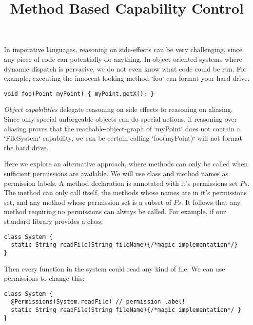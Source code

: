 \documentclass[a4paper,twoside,british,9pt]{extarticle}
\providecommand*{\code}[1]{\Q`#1`}
\begin{document}
\title{Method Based Capability Control}
\date{}
\maketitle
\vspace{-10ex}
In imperative languages, reasoning on side-effects can be very challenging,
since any piece of code can potentially do anything. In object oriented
systems where dynamic dispatch is pervasive, we do not even know what code
could be run. For example, executing the innocent looking method \code{foo}
can format your hard drive.

\begin{lstlisting}
void foo(Point myPoint) { myPoint.getX(); }
\end{lstlisting}

\emph{Object capabilities} delegate reasoning on side effects
to reasoning on aliasing. Since only special unforgeable objects can do
special actions, if reasoning over aliasing proves that the
reachable-object-graph of \code{myPoint} does not contain a \code{FileSystem}
capability, we can be certain calling \code{foo(myPoint)}
will not format the hard drive.

Here we explore an alternative approach, where methods can only be
called when sufficient permissions are available. 
We will use class and method names as permission labels.
A method declaration is annotated with it's permissions set $Ps$.
The method can only call itself, the methods whose names are in it's permissions set, 
and any method whose permission set is a subset of $Ps$. It follows that any method requiring no permissions can always be called.
For example, if our standard library
provides a class:

\begin{lstlisting}
class System { 
  static String readFile(String fileName){/*magic implementation*/}
}
\end{lstlisting}

Then every function in the system could read any kind of file. We
can use permissions to change this:

\begin{lstlisting}
class System { 
  @Permissions(System.readFile) // permission label! 
  static String readFile(String fileName){/*magic implementation*/ }
}
\end{lstlisting}
\end{document}
